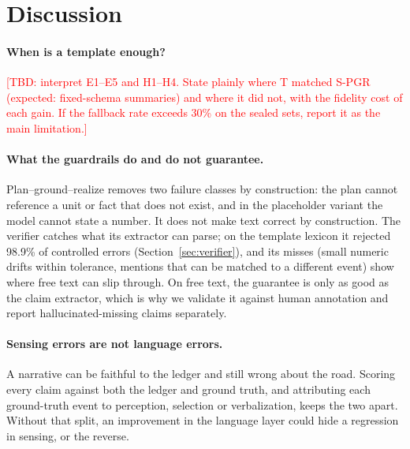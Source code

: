\providecommand{\TBD}[1][]{\textcolor{red}{[TBD#1]}}

\section{Discussion}
\label{sec:discussion}

\paragraph{When is a template enough?}
\TBD[: interpret E1--E5 and H1--H4. State plainly where T matched S-PGR (expected: fixed-schema summaries) and where it did not, with the fidelity cost of each gain. If the fallback rate exceeds 30\% on the sealed sets, report it as the main limitation.]

\paragraph{What the guardrails do and do not guarantee.}
Plan--ground--realize removes two failure classes by construction: the plan cannot reference a unit or fact that does not exist, and in the placeholder variant the model cannot state a number.
It does not make text correct by construction.
The verifier catches what its extractor can parse; on the template lexicon it rejected 98.9\% of controlled errors (Section~\ref{sec:verifier}), and its misses (small numeric drifts within tolerance, mentions that can be matched to a different event) show where free text can slip through.
On free text, the guarantee is only as good as the claim extractor, which is why we validate it against human annotation and report hallucinated-missing claims separately.

\paragraph{Sensing errors are not language errors.}
A narrative can be faithful to the ledger and still wrong about the road.
Scoring every claim against both the ledger and ground truth, and attributing each ground-truth event to perception, selection or verbalization, keeps the two apart.
Without that split, an improvement in the language layer could hide a regression in sensing, or the reverse.

